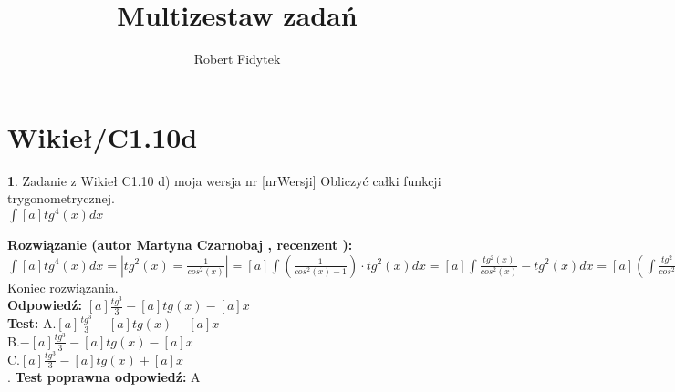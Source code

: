 \documentclass[12pt, a4paper]{article}
\title{Multizestaw zadań}
\author{Robert Fidytek}
\date{}
\theoremstyle{definition} %
\newtheorem{zad}{}
\newcommand{\kategoria}[1]{\section{#1}} %
\newcommand{\zadStart}[1]{\begin{zad}#1\newline} %
\newcommand{\zadStop}{\end{zad}}   %
\newcommand{\rozwStart}[2]{\noindent \textbf{Rozwiązanie (autor #1 , recenzent #2): }\newline} %
\newcommand{\rozwStop}{\newline}                                            %
\newcommand{\odpStart}{\noindent \textbf{Odpowiedź:}\newline}    %
\newcommand{\odpStop}{\newline}                                             %
\newcommand{\testStart}{\noindent \textbf{Test:}\newline} %
\newcommand{\testStop}{\newline} %
\newcommand{\kluczStart}{\noindent \textbf{Test poprawna odpowiedź:}\newline} %
\newcommand{\kluczStop}{\newline} %
\begin{document}
\maketitle


\kategoria{Wikieł/C1.10d}
\zadStart{Zadanie z Wikieł C1.10 d) moja wersja nr [nrWersji]}
Obliczyć całki funkcji trygonometrycznej.\\
$\int [a] tg^{4}(x) dx$\\
\zadStop
\rozwStart{Martyna Czarnobaj}{}
	$\int [a] tg^{4}(x) dx = | tg^{2}(x)=\frac{1}{cos^{2}(x)}| = [a] \int (\frac{1}{cos^{2}(x) - 1}) \cdot tg^{2}(x) dx = [a] \int \frac{tg^{2}(x)}{cos^{2}(x)} - tg^{2}(x) dx = [a] (\int \frac{tg^{2}(x)}{cos^{2}(x)} dx - \int tg^{2}(x) dx) = [a] (\frac{tg^{3}}{3} - tg(x) - x) = [a]\frac{tg^{3}}{3} - [a]tg(x) - [a]x$\\ 


Koniec rozwiązania.\\
\rozwStop
\odpStart
$[a]\frac{tg^{3}}{3} - [a]tg(x) - [a]x$\\
\odpStop
\testStart
A.$[a]\frac{tg^{3}}{3} - [a]tg(x) - [a]x$\\
B.$-[a]\frac{tg^{3}}{3} - [a]tg(x) - [a]x$\\
C.$[a]\frac{tg^{3}}{3} - [a]tg(x) + [a]x$\\
.
\testStop
\kluczStart
A
\kluczStop
\end{document}
